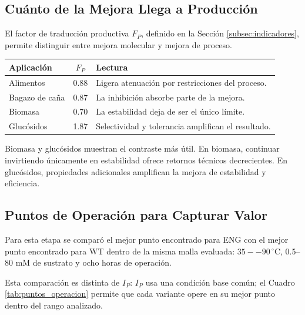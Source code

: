 \subsection{Cuánto de la Mejora Llega a Producción}
\label{subsec:traduccion_produccion}

El factor de traducción productiva \(F_P\), definido en la Sección
\ref{subsec:indicadores}, permite distinguir entre mejora molecular y mejora de
proceso.

\begin{table}[H]
\centering
{}



\renewcommand{\arraystretch}{1.25}

\begin{tabular}{|l|c|l|}
\hline
Aplicación & \(F_P\) & Lectura \\ \hline
Alimentos & 0.88 & Ligera atenuación por restricciones del proceso. \\ \hline
Bagazo de caña & 0.87 & La inhibición absorbe parte de la mejora. \\ \hline
Biomasa & 0.70 & La estabilidad deja de ser el único límite. \\ \hline
Glucósidos & 1.87 & Selectividad y tolerancia amplifican el resultado. \\ \hline
\end{tabular}
\end{table}

Biomasa y glucósidos muestran el contraste más útil. En biomasa, continuar
invirtiendo únicamente en estabilidad ofrece retornos técnicos decrecientes. En
glucósidos, propiedades adicionales amplifican la mejora de estabilidad y
eficiencia.

\subsection{Puntos de Operación para Capturar Valor}
\label{subsec:monetizacion}

Para esta etapa se comparó el mejor punto encontrado para ENG con el mejor punto
encontrado para WT dentro de la misma malla evaluada: \(35--90\,^{\circ}\mathrm{C}\),
0.5--80 mM de sustrato y ocho horas de operación.

Esta comparación es distinta de \(I_P\): \(I_P\) usa una condición base común;
el Cuadro \ref{tab:puntos_operacion} permite que cada variante opere en su mejor
punto dentro del rango analizado.

